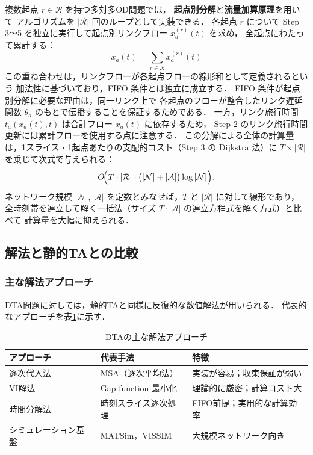 複数起点 $r \in \mathcal{R}$ を持つ多対多OD問題では，
\textbf{起点別分解}と\textbf{流量加算原理}を用いて
アルゴリズムを $|\mathcal{R}|$ 回のループとして実装できる．
各起点 $r$ について Step 3〜5 を独立に実行して起点別リンクフロー $x_a^{(r)}(t)$ を求め，
全起点にわたって累計する：
\begin{equation}
  x_a(t) = \sum_{r \in \mathcal{R}} x_a^{(r)}(t)
  \label{eq:flow-superposition}
\end{equation}
この重ね合わせは，リンクフローが各起点フローの線形和として定義されるという
加法性に基づいており，FIFO 条件とは独立に成立する．
FIFO 条件が起点別分解に必要な理由は，同一リンク上で
各起点のフローが整合したリンク遅延関数 $\theta_a$ のもとで伝播することを保証するためである．
一方，リンク旅行時間 $t_a(x_a(t), t)$ は合計フロー $x_a(t)$ に依存するため，
Step 2 のリンク旅行時間更新には累計フローを使用する点に注意する．
この分解による全体の計算量は，1スライス・1起点あたりの支配的コスト（Step 3 の Dijkstra 法）に
$T \times |\mathcal{R}|$ を乗じて次式で与えられる\cite{KuwaharaAkamatsu2001}：
\begin{equation}
  O\!\Bigl(T \cdot |\mathcal{R}| \cdot \bigl(|\mathcal{N}|+|\mathcal{A}|\bigr)\log|\mathcal{N}|\Bigr).
  \label{eq:dta-complexity}
\end{equation}
ネットワーク規模 $|\mathcal{N}|, |\mathcal{A}|$ を定数とみなせば，$T$ と $|\mathcal{R}|$ に対して線形であり，
全時刻帯を連立して解く一括法（サイズ $T \cdot |\mathcal{A}|$ の連立方程式を解く方式）と比べて
計算量を大幅に抑えられる．

\subsection{解法と静的TAとの比較}
\label{subsec:dta-solution}

\subsubsection*{主な解法アプローチ}

DTA問題に対しては，静的TAと同様に反復的な数値解法が用いられる．
代表的なアプローチを表\ref{tab:dta-methods}に示す．

\begin{table}[hbtp]
  \centering
  \caption{DTAの主な解法アプローチ}
  \label{tab:dta-methods}
  \begin{tabular}{lll}
    \toprule
    アプローチ & 代表手法 & 特徴 \\
    \midrule
    逐次代入法   & MSA（逐次平均法）& 実装が容易；収束保証が弱い \\
    VI解法       & Gap function 最小化 & 理論的に厳密；計算コスト大 \\
    時間分解法   & 時刻スライス逐次処理 & FIFO前提；実用的な計算効率 \\
    シミュレーション基盤 & MATSim，VISSIM & 大規模ネットワーク向き \\
    \bottomrule
  \end{tabular}
\end{table}

